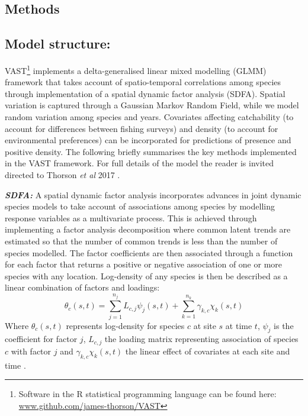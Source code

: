 \documentclass{nature}
\begin{document}
\begin{linenumbers}
\section*{Methods}

\subsection{Model structure:} 

VAST\footnote{Software in the R statistical programming language can be found
	here: \url{www.github.com/james-thorson/VAST}} implements a
delta-generalised linear mixed modelling (GLMM) framework that takes account of
spatio-temporal correlations among species through implementation of a
spatial dynamic factor analysis (SDFA). Spatial variation is captured through a
Gaussian Markov Random Field, while we model random variation among
species and years. Covariates affecting catchability (to account for
differences between fishing surveys) and density (to account for environmental
preferences) can be incorporated for predictions of presence and positive
density. The following briefly summarises the key methods implemented in the
VAST framework. For full details of the model the reader is invited directed to
Thorson \textit{et al} 2017 \cite{Thorson2017}.

\textbf{\textit{SDFA:}} A spatial dynamic factor analysis incorporates advances
in joint dynamic species models \cite{Thorson2017} to take account of
associations among species by modelling response variables as a
multivariate process. This is achieved through implementing a factor analysis
decomposition where common latent trends are estimated so that the number of
common trends is less than the number of species modelled. The factor
coefficients are then associated through a function for each factor that
returns a positive or negative association of one or more species with any
location. Log-density of any species is then be described as a linear
combination of factors and loadings:
	\begin{equation}
		\theta_{c}(s,t) = \sum_{j=1}^{n_{j}}
		L_{c,j}\psi_{j}(s,t) +\sum_{k=1}^{n_{k}}
		\gamma_{k,c}\chi_{k}(s,t)
	\end{equation}
Where $\theta_{c}(s,t)$ represents log-density for species $c$ at site $s$ at
time $t$, $\psi_{j}$ is the coefficient for factor $j$, $L_{c,j}$ the loading
matrix representing association of species $c$ with factor $j$ and
$\gamma_{k,c}\chi_{k}(s,t)$ the linear effect of covariates at each site and
time \cite{Thorson2016b}. 


\end{linenumbers}
\end{document}
